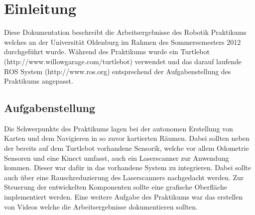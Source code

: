 \chapter{Einleitung}

Diese Dokumentation beschreibt die Arbeitsergebnisse des Robotik Praktikums welches an der Universität Oldenburg im Rahmen des Sommersemesters 2012 durchgeführt wurde. Während des Praktikums wurde ein Turtlebot (http://www.willowgarage.com/turtlebot) verwendet und das darauf laufende ROS System (http://www.ros.org) entsprechend der Aufgabenstellung des Praktikums angepasst.

\section{Aufgabenstellung}

Die Schwerpunkte des Praktikums lagen bei der autonomen Erstellung von Karten und dem Navigieren in so zuvor kartierten Räumen. Dabei sollten neben der bereits auf dem Turtlebot vorhandene Sensorik, welche vor allem Odometrie Sensoren und eine Kinect umfasst, auch ein Laserscanner zur Anwendung kommen. Dieser war dafür in das vorhandene System zu integrieren. Dabei sollte auch über eine Rauschreduzierung des Laserscanners nachgedacht werden. Zur Steuerung der entwickelten Komponenten sollte eine grafische Oberfläche implementiert werden.
Eine weitere Aufgabe des Praktikums war das erstellen von Videos welche die Arbeitsergebnisse dokumentieren sollten.